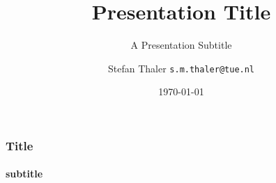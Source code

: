 \documentclass{beamer}
\title{Presentation Title}
\subtitle{A Presentation Subtitle}
\author[sthaler]{Stefan Thaler \texttt{s.m.thaler@tue.nl}}
\date{\today}
\begin{document}
%
%
\begin{frame}[title-01]
\end{frame}

\begin{frame}[title-02]
 \titlepage
\end{frame}

\begin{frame}[title-03]
 \titlepage
\end{frame}

%
%
\begin{frame}[content-a1]
 \frametitle{Title}
 \framesubtitle{subtitle}
\end{frame}

\begin{frame}[content-a2]
\end{frame}

%
%
\begin{frame}[content-b1]
\end{frame}

\begin{frame}[content-b2]
\end{frame}

\begin{frame}[content-b3]
\end{frame}

%
%
\begin{frame}[content-c1]
\end{frame}

\begin{frame}[content-c2]
\end{frame}

\begin{frame}[content-c3]
\end{frame}

\begin{frame}[content-c4]
\end{frame}
\end{document}
